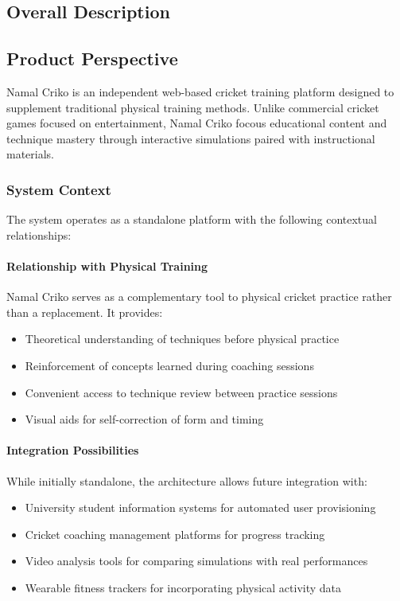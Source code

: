 \documentclass[12pt,a4paper]{article}
\begin{document}
\begin{enumerate}
\newpage

\section{Overall Description}

\subsection{Product Perspective}
Namal Criko is an independent web-based cricket training platform designed to supplement traditional physical training methods. Unlike commercial cricket games focused on entertainment, Namal Criko focous educational content and technique mastery through interactive simulations paired with instructional materials.

\subsubsection{System Context}
The system operates as a standalone platform with the following contextual relationships:

\paragraph{Relationship with Physical Training}
Namal Criko serves as a complementary tool to physical cricket practice rather than a replacement. It provides:
\begin{itemize}
    \item Theoretical understanding of techniques before physical practice
    \item Reinforcement of concepts learned during coaching sessions
    \item Convenient access to technique review between practice sessions
    \item Visual aids for self-correction of form and timing
\end{itemize}

\paragraph{Integration Possibilities}
While initially standalone, the architecture allows future integration with:
\begin{itemize}
    \item University student information systems for automated user provisioning
    \item Cricket coaching management platforms for progress tracking
    \item Video analysis tools for comparing simulations with real performances
    \item Wearable fitness trackers for incorporating physical activity data
\end{itemize}


\end{enumerate}
\end{document}
